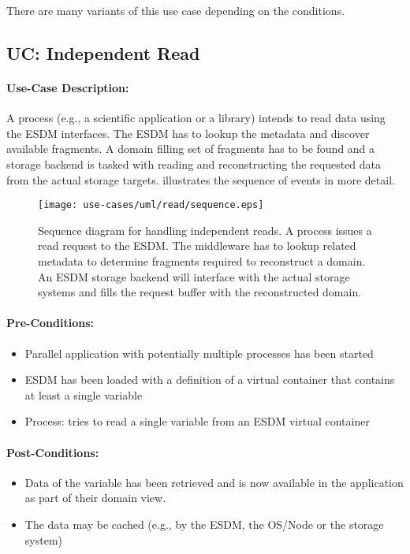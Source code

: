 There are many variants of this use case depending on the conditions.






\subsection{UC: Independent Read}
\label{uc: independent read}

\paragraph{Use-Case Description:}
A process (e.g., a scientific application or a library) intends to read data using the ESDM interfaces.
The ESDM has to lookup the metadata and discover available fragments. A domain filling set of fragments has to be found and a storage backend is tasked with reading and reconstructing the requested data from the actual storage targets.
 illustrates the sequence of events in more detail.


\begin{figure}
	\centering
	\texttt{[image: use-cases/uml/read/sequence.eps]}
	\caption{Sequence diagram for handling independent reads. A process issues a read request to the ESDM. The middleware has to lookup related metadata to determine fragments required to reconstruct a domain. An ESDM storage backend will interface with the actual storage systems and fills the request buffer with the reconstructed domain.}
	\label{fig:sequence independent read}
\end{figure}



\paragraph{Pre-Conditions:}

\begin{itemize}
	\item Parallel application with potentially multiple processes has been started
	\item ESDM has been loaded with a definition of a virtual container that contains at least a single variable
	\item Process: tries to read a single variable from an ESDM virtual container
\end{itemize}

\paragraph{Post-Conditions:}
\begin{itemize}
	\item Data of the variable has been retrieved and is now available in the application as part of their domain view.
	\item The data may be cached (e.g., by the ESDM, the OS/Node or the storage system)
\end{itemize}

